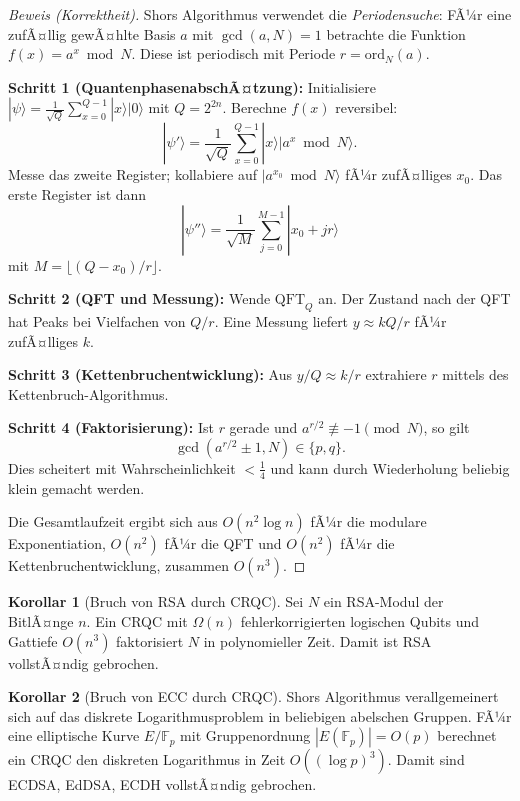 ﻿\documentclass[a4paper,12pt]{article}
\theoremstyle{definition}
\newtheorem{korollar}{Korollar}[section]
\begin{document}
\begin{proof}[Beweis (Korrektheit)]
Shors Algorithmus verwendet die \emph{Periodensuche}: FÃ¼r eine zufÃ¤llig gewÃ¤hlte
Basis $a$ mit $\gcd(a, N) = 1$ betrachte die Funktion $f(x) = a^x \bmod N$.
Diese ist periodisch mit Periode $r = \mathrm{ord}_N(a)$.

\textbf{Schritt 1 (QuantenphasenabschÃ¤tzung):}
Initialisiere $|\psi\rangle = \frac{1}{\sqrt{Q}} \sum_{x=0}^{Q-1} |x\rangle |0\rangle$
mit $Q = 2^{2n}$. Berechne $f(x)$ reversibel:
\[
  |\psi'\rangle = \frac{1}{\sqrt{Q}} \sum_{x=0}^{Q-1} |x\rangle |a^x \bmod N\rangle.
\]
Messe das zweite Register; kollabiere auf $|a^{x_0} \bmod N\rangle$ fÃ¼r
zufÃ¤lliges $x_0$. Das erste Register ist dann
\[
  |\psi''\rangle = \frac{1}{\sqrt{M}} \sum_{j=0}^{M-1} |x_0 + jr\rangle
\]
mit $M = \lfloor (Q - x_0)/r \rfloor$.

\textbf{Schritt 2 (QFT und Messung):}
Wende $\mathrm{QFT}_Q$ an. Der Zustand nach der QFT hat Peaks bei
Vielfachen von $Q/r$. Eine Messung liefert $y \approx kQ/r$ fÃ¼r zufÃ¤lliges $k$.

\textbf{Schritt 3 (Kettenbruchentwicklung):}
Aus $y/Q \approx k/r$ extrahiere $r$ mittels des Kettenbruch-Algorithmus.

\textbf{Schritt 4 (Faktorisierung):}
Ist $r$ gerade und $a^{r/2} \not\equiv -1 \pmod{N}$, so gilt
\[
  \gcd(a^{r/2} \pm 1, N) \in \{p, q\}.
\]
Dies scheitert mit Wahrscheinlichkeit $< \frac{1}{4}$ und kann durch Wiederholung
beliebig klein gemacht werden.

Die Gesamtlaufzeit ergibt sich aus $O(n^2 \log n)$ fÃ¼r die modulare Exponentiation,
$O(n^2)$ fÃ¼r die QFT und $O(n^2)$ fÃ¼r die Kettenbruchentwicklung, zusammen $O(n^3)$.
\end{proof}

\begin{korollar}[Bruch von RSA durch CRQC]
Sei $N$ ein RSA-Modul der BitlÃ¤nge $n$. Ein CRQC mit $\Omega(n)$ fehlerkorrigierten
logischen Qubits und Gattiefe $O(n^3)$ faktorisiert $N$ in polynomieller Zeit.
Damit ist RSA vollstÃ¤ndig gebrochen.
\end{korollar}

\begin{korollar}[Bruch von ECC durch CRQC]
Shors Algorithmus verallgemeinert sich auf das diskrete Logarithmusproblem in
beliebigen abelschen Gruppen. FÃ¼r eine elliptische Kurve $E/\mathbb{F}_p$ mit
Gruppenordnung $|E(\mathbb{F}_p)| = O(p)$ berechnet ein CRQC den diskreten
Logarithmus in Zeit $O((\log p)^3)$. Damit sind ECDSA, EdDSA, ECDH vollstÃ¤ndig gebrochen.
\end{korollar}
\end{document}

